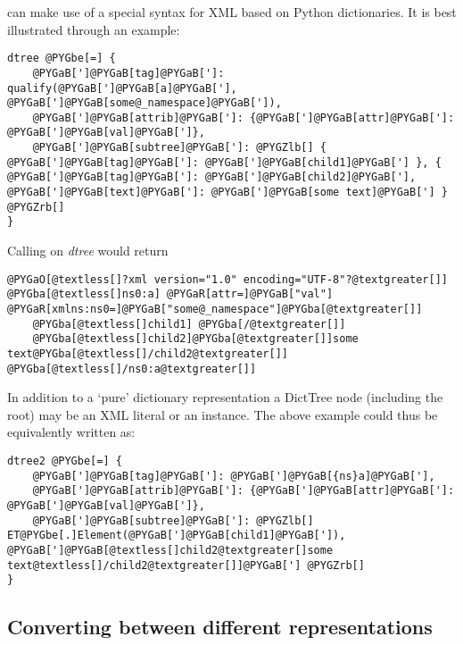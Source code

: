 \documentclass[a4paper,10pt,english]{manual}
\begin{document}
 can make use of a special syntax for XML based on Python dictionaries. It is best illustrated through an example:

\begin{Verbatim}[commandchars=@\[\]]
dtree @PYGbe[=] {
    @PYGaB[']@PYGaB[tag]@PYGaB[']: qualify(@PYGaB[']@PYGaB[a]@PYGaB['], @PYGaB[']@PYGaB[some@_namespace]@PYGaB[']),
    @PYGaB[']@PYGaB[attrib]@PYGaB[']: {@PYGaB[']@PYGaB[attr]@PYGaB[']: @PYGaB[']@PYGaB[val]@PYGaB[']},
    @PYGaB[']@PYGaB[subtree]@PYGaB[']: @PYGZlb[] { @PYGaB[']@PYGaB[tag]@PYGaB[']: @PYGaB[']@PYGaB[child1]@PYGaB['] }, { @PYGaB[']@PYGaB[tag]@PYGaB[']: @PYGaB[']@PYGaB[child2]@PYGaB['], @PYGaB[']@PYGaB[text]@PYGaB[']: @PYGaB[']@PYGaB[some text]@PYGaB['] } @PYGZrb[]
}
\end{Verbatim}

Calling \hyperlink{ncclient.content.dtree2xml}{} on \emph{dtree} would return

\begin{Verbatim}[commandchars=@\[\]]
@PYGaO[@textless[]?xml version="1.0" encoding="UTF-8"?@textgreater[]]
@PYGba[@textless[]ns0:a] @PYGaR[attr=]@PYGaB["val"] @PYGaR[xmlns:ns0=]@PYGaB["some@_namespace"]@PYGba[@textgreater[]]
    @PYGba[@textless[]child1] @PYGba[/@textgreater[]]
    @PYGba[@textless[]child2]@PYGba[@textgreater[]]some text@PYGba[@textless[]/child2@textgreater[]]
@PYGba[@textless[]/ns0:a@textgreater[]]
\end{Verbatim}

In addition to a `pure' dictionary representation a DictTree node (including the root) may be an XML literal or an \href{http://docs.python.org/library/xml.etree.elementtree.html\#xml.etree.ElementTree.Element}{} instance. The above example could thus be equivalently written as:

\begin{Verbatim}[commandchars=@\[\]]
dtree2 @PYGbe[=] {
    @PYGaB[']@PYGaB[tag]@PYGaB[']: @PYGaB[']@PYGaB[{ns}a]@PYGaB['],
    @PYGaB[']@PYGaB[attrib]@PYGaB[']: {@PYGaB[']@PYGaB[attr]@PYGaB[']: @PYGaB[']@PYGaB[val]@PYGaB[']},
    @PYGaB[']@PYGaB[subtree]@PYGaB[']: @PYGZlb[] ET@PYGbe[.]Element(@PYGaB[']@PYGaB[child1]@PYGaB[']), @PYGaB[']@PYGaB[@textless[]child2@textgreater[]some text@textless[]/child2@textgreater[]]@PYGaB['] @PYGZrb[]
}
\end{Verbatim}


\subsection{Converting between different representations}
\end{document}
